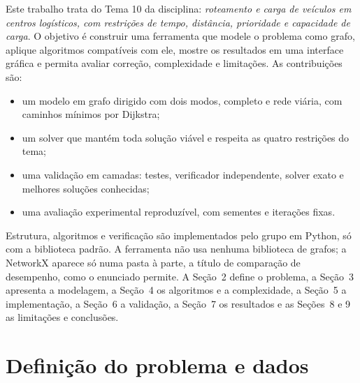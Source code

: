 \documentclass[12pt]{article}
\begin{document}
Este trabalho trata do Tema 10 da disciplina: \emph{roteamento e carga de veículos em centros logísticos, com restrições de tempo, distância, prioridade e capacidade de carga}. O objetivo é construir uma ferramenta que modele o problema como grafo, aplique algoritmos compatíveis com ele, mostre os resultados em uma interface gráfica e permita avaliar correção, complexidade e limitações. As contribuições são:
\begin{itemize}
  \item um modelo em grafo dirigido com dois modos, completo e rede viária, com caminhos mínimos por Dijkstra;
  \item um solver que mantém toda solução viável e respeita as quatro restrições do tema;
  \item uma validação em camadas: testes, verificador independente, solver exato e melhores soluções conhecidas;
  \item uma avaliação experimental reproduzível, com sementes e iterações fixas.
\end{itemize}
Estrutura, algoritmos e verificação são implementados pelo grupo em Python, só com a biblioteca padrão. A ferramenta não usa nenhuma biblioteca de grafos; a NetworkX aparece só numa pasta à parte, a título de comparação de desempenho, como o enunciado permite. A Seção~2 define o problema, a Seção~3 apresenta a modelagem, a Seção~4 os algoritmos e a complexidade, a Seção~5 a implementação, a Seção~6 a validação, a Seção~7 os resultados e as Seções~8 e 9 as limitações e conclusões.

\section{Definição do problema e dados}
\end{document}
